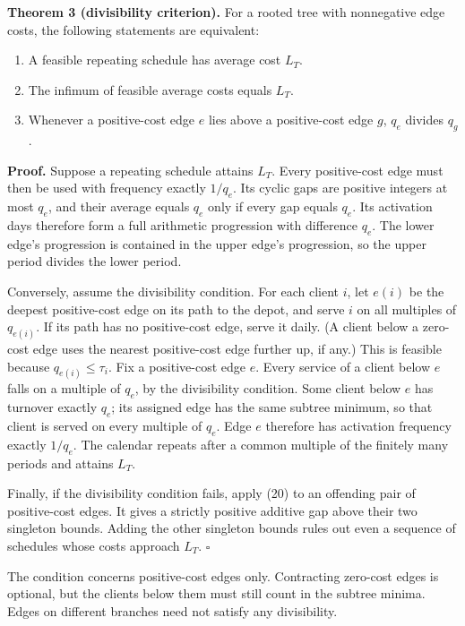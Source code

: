 \documentclass[
  british,
  11pt,
  a4paper,
]{article}
\providecommand{\tightlist}{%
  \setlength{\itemsep}{0pt}\setlength{\parskip}{0pt}}
\begin{document}
\textbf{Theorem 3 (divisibility criterion).} For a rooted tree with
nonnegative edge costs, the following statements are equivalent:

\begin{enumerate}
\def\labelenumi{\arabic{enumi}.}
\tightlist
\item
  A feasible repeating schedule has average cost \(L_T\).
\item
  The infimum of feasible average costs equals \(L_T\).
\item
  Whenever a positive-cost edge \(e\) lies above a positive-cost edge
  \(g\), \(q_e\) divides \(q_g\).
\end{enumerate}

\textbf{Proof.} Suppose a repeating schedule attains \(L_T\). Every
positive-cost edge must then be used with frequency exactly \(1/q_e\).
Its cyclic gaps are positive integers at most \(q_e\), and their average
equals \(q_e\) only if every gap equals \(q_e\). Its activation days
therefore form a full arithmetic progression with difference \(q_e\).
The lower edge's progression is contained in the upper edge's
progression, so the upper period divides the lower period.

Conversely, assume the divisibility condition. For each client \(i\),
let \(e(i)\) be the deepest positive-cost edge on its path to the depot,
and serve \(i\) on all multiples of \(q_{e(i)}\). If its path has no
positive-cost edge, serve it daily. (A client below a zero-cost edge
uses the nearest positive-cost edge further up, if any.) This is
feasible because \(q_{e(i)}\le\tau_i\). Fix a positive-cost edge \(e\).
Every service of a client below \(e\) falls on a multiple of \(q_e\), by
the divisibility condition. Some client below \(e\) has turnover exactly
\(q_e\); its assigned edge has the same subtree minimum, so that client
is served on every multiple of \(q_e\). Edge \(e\) therefore has
activation frequency exactly \(1/q_e\). The calendar repeats after a
common multiple of the finitely many periods and attains \(L_T\).

Finally, if the divisibility condition fails, apply (20) to an offending
pair of positive-cost edges. It gives a strictly positive additive gap
above their two singleton bounds. Adding the other singleton bounds
rules out even a sequence of schedules whose costs approach \(L_T\).
\(\square\)

The condition concerns positive-cost edges only. Contracting zero-cost
edges is optional, but the clients below them must still count in the
subtree minima. Edges on different branches need not satisfy any
divisibility.
\end{document}
